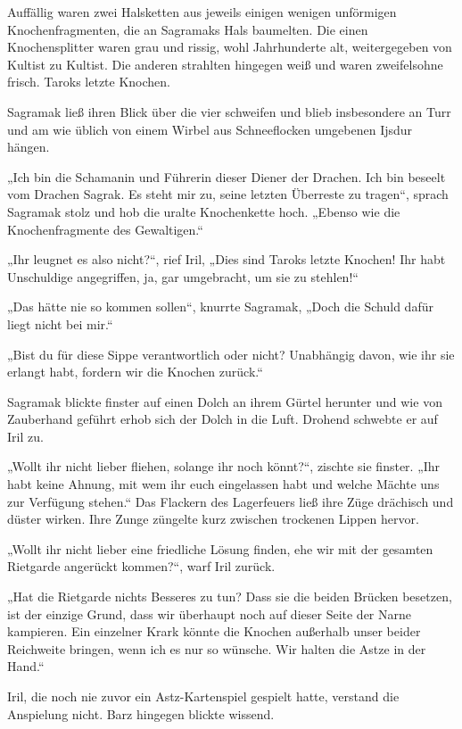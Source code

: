 Auffällig waren zwei Halsketten aus jeweils einigen wenigen unförmigen Knochenfragmenten, die an Sagramaks Hals baumelten. Die einen Knochensplitter waren grau und rissig, wohl Jahrhunderte alt, weitergegeben von Kultist zu Kultist. Die anderen strahlten hingegen weiß und waren zweifelsohne frisch. Taroks letzte Knochen.

Sagramak ließ ihren Blick über die vier schweifen und blieb insbesondere an Turr und am wie üblich von einem Wirbel aus Schneeflocken umgebenen Ijsdur hängen.

„Ich bin die Schamanin und Führerin dieser Diener der Drachen. Ich bin beseelt vom Drachen Sagrak. Es steht mir zu, seine letzten Überreste zu tragen“, sprach Sagramak stolz und hob die uralte Knochenkette hoch. „Ebenso wie die Knochenfragmente des Gewaltigen.“

„Ihr leugnet es also nicht?“, rief Iril, „Dies sind Taroks letzte Knochen! Ihr habt Unschuldige angegriffen, ja, gar umgebracht, um sie zu stehlen!“

„Das hätte nie so kommen sollen“, knurrte Sagramak, „Doch die Schuld dafür liegt nicht bei mir.“

„Bist du für diese Sippe verantwortlich oder nicht? Unabhängig davon, wie ihr sie erlangt habt, fordern wir die Knochen zurück.“

Sagramak blickte finster auf einen Dolch an ihrem Gürtel herunter und wie von Zauberhand geführt erhob sich der Dolch in die Luft. Drohend schwebte er auf Iril zu.

„Wollt ihr nicht lieber fliehen, solange ihr noch könnt?“, zischte sie finster. „Ihr habt keine Ahnung, mit wem ihr euch eingelassen habt und welche Mächte uns zur Verfügung stehen.“ Das Flackern des Lagerfeuers ließ ihre Züge drächisch und düster wirken. Ihre Zunge züngelte kurz zwischen trockenen Lippen hervor.

„Wollt ihr nicht lieber eine friedliche Lösung finden, ehe wir mit der gesamten Rietgarde angerückt kommen?“, warf Iril zurück.

„Hat die Rietgarde nichts Besseres zu tun? Dass sie die beiden Brücken besetzen, ist der einzige Grund, dass wir überhaupt noch auf dieser Seite der Narne kampieren. Ein einzelner Krark könnte die Knochen außerhalb unser beider Reichweite bringen, wenn ich es nur so wünsche. Wir halten die Astze in der Hand.“

Iril, die noch nie zuvor ein Astz-Kartenspiel gespielt hatte, verstand die Anspielung nicht. Barz hingegen blickte wissend.

